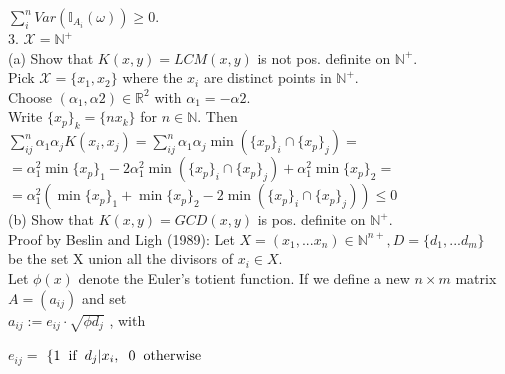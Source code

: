 \documentclass[18pt]{article}
\begin{document}
\begin{flushleft}
$\sum_i^n Var(\mathbb{I}_{A_i}(\omega)) \geq 0$.\\
\vspace{.4cm}
3. $\mathcal{X} =\mathbb{N}^{+}$\\
\vspace{.4cm}
(a) Show that $K(x,y)=LCM(x,y)$ is not pos. definite on $\mathbb{N}^{+}$.\\
\vspace{.4cm}
Pick $\mathcal{X} = \{ x_1,x_2\}$ where the $x_i$ are distinct points in $\mathbb{N}^{+}$.\\
Choose $(\alpha_1,\alpha2) \in \mathbb{R}^2$ with $\alpha_1=-\alpha2$. \\
\vspace{.4cm}
Write $\{x_p\}_k=\{n x_k\}$ for $n \in \mathbb{N}$. Then \\
\vspace{.4cm}
$\sum_{ij}^n \alpha_1 \alpha_j K(x_i,x_j)=\sum_{ij}^n \alpha_1 \alpha_j \min(\{x_p\}_i \cap \{x_p\}_j)=$\\
$=\alpha_1^2 \min\{x_p\}_1-2 \alpha_1^2 \min(\{x_p\}_i \cap \{x_p\}_j)+\alpha_1^2 \min\{x_p\}_2=$\\
$=\alpha_1^2\left(\min\{x_p\}_1+\min\{x_p\}_2-2 \min(\{x_p\}_i \cap \{x_p\}_j)\right) \leq 0$\\
\vspace{.4cm}
(b) Show that $K(x,y)=GCD(x,y)$ is pos. definite on $\mathbb{N}^{+}$.\\
\vspace{.5cm}
Proof by Beslin and Ligh (1989):
Let $X=(x_1,...x_n) \in \mathbb{N}^{n+}, D=\{d_1,...d_m\}$\\
be the set X union all the divisors of $x_i \in X$.\\
\vspace{.5cm}
Let $\phi(x)$ denote the Euler's totient function. If we define a new $n \times m$ matrix\\
$A=(a_{ij})$ and set\\
\vspace{.4cm}
\hspace{4cm} $a_{ij}:=e_{ij} \cdot \sqrt{\phi{d_j}}$ , with
\vspace{.4cm}

   \hspace{4cm}         $e_{ij}=$
                    $\left\{1 \hspace{.2cm} \text{if} \hspace{.2cm} d_j| x_i,\hspace{.2cm} 0 \hspace{.2cm} \text{otherwise} \right.$


\end{flushleft}
\end{document}
